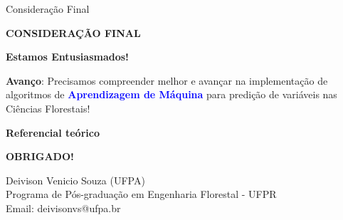 \documentclass[12pt,ignorenonframetext,aspectratio=1610]{beamer}
\begin{document}
\begin{frame}[t]{Consideração Final}
	
	\textbf{CONSIDERAÇÃO FINAL} \newline
	
    \textbf{Estamos Entusiasmados! \dLaughey[2]} \newline
    
    \justifying
	\textbf{Avanço}: Precisamos compreender melhor e avançar na implementação de algoritmos de \textcolor{blue}{\textbf{Aprendizagem de Máquina}} para predição de variáveis nas Ciências Florestais! \newline \newline
	
	
	\Springtree[10]
	

\end{frame}
\begin{frame}[allowframebreaks]

	\textbf{Referencial teórico}
	
	
	
\end{frame}

\begin{frame}[c]{}
	
	\begin{center}
		{\Large \textbf{OBRIGADO!}}
		
		Deivison Venicio Souza (UFPA) \\
		Programa de Pós-graduação em Engenharia Florestal - UFPR \\
		Email: deivisonvs@ufpa.br
	\end{center}
	
\end{frame}
\end{document}
